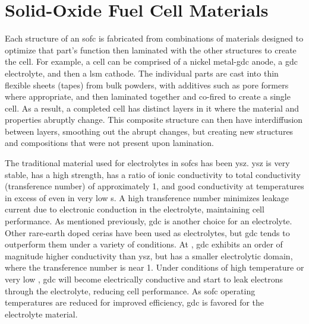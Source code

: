 \section{Solid-Oxide Fuel Cell Materials}
    Each structure of an \gls{sofc} is fabricated from combinations of materials designed to optimize that part's function then laminated with the other structures to create the cell.
    For example, a cell can be comprised of a nickel metal-\gls{gdc} anode, a \gls{gdc} electrolyte, and then a \gls{lsm} cathode.\cite{Liu2002,Haile2003}
    The individual parts are cast into thin flexible sheets (tapes) from bulk powders, with additives such as pore formers where appropriate, and then laminated together and co-fired to create a single cell.
    As a result, a completed cell has distinct layers in it where the material and properties abruptly change.
    This composite structure can then have interdiffusion between layers, smoothing out the abrupt changes, but creating new structures and compositions that were not present upon lamination.\cite{Yokokawa2008}

    The traditional material used for electrolytes in \glspl{sofc} has been \gls{ysz}.
    \Gls{ysz} is very stable, has a high strength, has a ratio of ionic conductivity to total conductivity (transference number) of approximately 1, and good conductivity at temperatures in excess of  even in very low s.
    A high transference number minimizes leakage current due to electronic conduction in the electrolyte, maintaining cell performance.
    As mentioned previously, \gls{gdc} is another choice for an electrolyte.
    Other rare-earth doped cerias have been used as electrolytes, but \gls{gdc} tends to outperform them under a variety of conditions.%
    At , \gls{gdc} exhibits an order of magnitude higher conductivity than \gls{ysz}, but has a smaller electrolytic domain, where the transference number is near 1.\cite{Inaba1996}
    Under conditions of high temperature or very low , \gls{gdc} will become electrically conductive and start to leak electrons through the electrolyte, reducing cell performance.
    As \gls{sofc} operating temperatures are reduced for improved efficiency, \gls{gdc} is favored for the electrolyte material.

